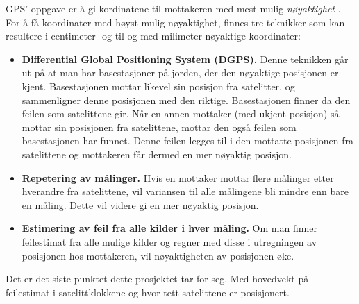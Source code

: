 GPS' oppgave er å gi kordinatene til mottakeren med mest mulig \textit{nøyaktighet} . For å få koordinater med høyst mulig nøyaktighet, finnes tre teknikker som kan resultere i centimeter- og til og med milimeter nøyaktige koordinater: \cite{StrangBorre}
\begin{itemize}
  \item \textbf{Differential Global Positioning System (DGPS).} Denne teknikken går ut på at man har basestasjoner på jorden, der  den nøyaktige posisjonen er kjent. Basestasjonen mottar likevel sin posisjon fra satelitter, og sammenligner denne posisjonen med den riktige. Basestasjonen finner da den feilen som satelittene gir. Når en annen mottaker (med ukjent posisjon) så mottar sin posisjonen fra satelittene, mottar den også feilen som basestasjonen har funnet. Denne feilen legges til i den mottatte posisjonen fra satelittene og mottakeren får dermed en mer nøyaktig posisjon. \cite{DGPS}
  \item \textbf{Repetering av målinger.} Hvis en mottaker mottar flere målinger etter hverandre fra satelittene, vil variansen til alle målingene bli mindre enn bare en måling. Dette vil videre gi en mer nøyaktig posisjon. 
  \item \textbf{Estimering av feil fra alle kilder i hver måling.}  Om man finner feilestimat fra alle mulige kilder og regner med disse i utregningen av posisjonen hos mottakeren, vil nøyaktigheten av posisjonen øke. 
\end{itemize}
Det er det siste punktet dette prosjektet tar for seg. Med hovedvekt på feilestimat i satelittklokkene og hvor tett satelittene er posisjonert. 




	
